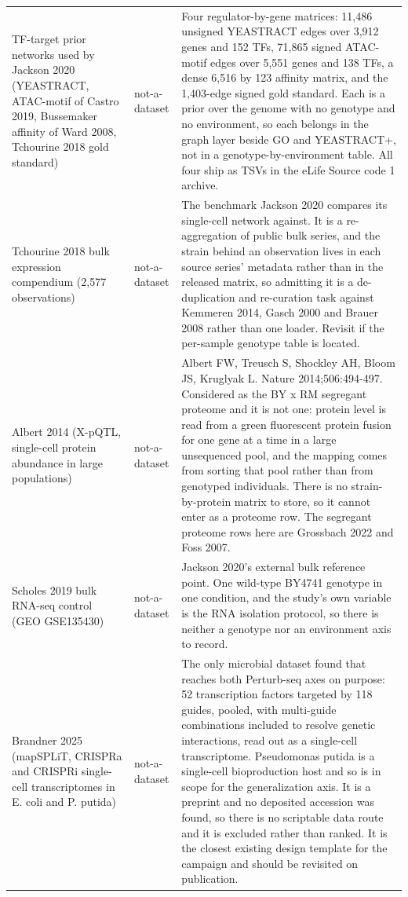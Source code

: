 \begin{longtable}{@{}L{62mm} L{22mm} L{85mm}@{}}
\addlinespace[5pt]
TF-target prior networks used by Jackson 2020 (YEASTRACT, ATAC-motif of Castro 2019, Bussemaker affinity of Ward 2008, Tchourine 2018 gold standard) & not-a-dataset & Four regulator-by-gene matrices: 11,486 unsigned YEASTRACT edges over 3,912 genes and 152 TFs, 71,865 signed ATAC-motif edges over 5,551 genes and 138 TFs, a dense 6,516 by 123 affinity matrix, and the 1,403-edge signed gold standard. Each is a prior over the genome with no genotype and no environment, so each belongs in the graph layer beside GO and YEASTRACT+, not in a genotype-by-environment table. All four ship as TSVs in the eLife Source code 1 archive. \\
\addlinespace[5pt]
Tchourine 2018 bulk expression compendium (2,577 observations) & not-a-dataset & The benchmark Jackson 2020 compares its single-cell network against. It is a re-aggregation of public bulk series, and the strain behind an observation lives in each source series' metadata rather than in the released matrix, so admitting it is a de-duplication and re-curation task against Kemmeren 2014, Gasch 2000 and Brauer 2008 rather than one loader. Revisit if the per-sample genotype table is located. \\
\addlinespace[5pt]
Albert 2014 (X-pQTL, single-cell protein abundance in large populations) & not-a-dataset & Albert FW, Treusch S, Shockley AH, Bloom JS, Kruglyak L. Nature 2014;506:494-497. Considered as the BY x RM segregant proteome and it is not one: protein level is read from a green fluorescent protein fusion for one gene at a time in a large unsequenced pool, and the mapping comes from sorting that pool rather than from genotyped individuals. There is no strain-by-protein matrix to store, so it cannot enter as a proteome row. The segregant proteome rows here are Grossbach 2022 and Foss 2007. \\
\addlinespace[5pt]
Scholes 2019 bulk RNA-seq control (GEO GSE135430) & not-a-dataset & Jackson 2020's external bulk reference point. One wild-type BY4741 genotype in one condition, and the study's own variable is the RNA isolation protocol, so there is neither a genotype nor an environment axis to record. \\
\addlinespace[5pt]
Brandner 2025 (mapSPLiT, CRISPRa and CRISPRi single-cell transcriptomes in E. coli and P. putida) & not-a-dataset & The only microbial dataset found that reaches both Perturb-seq axes on purpose: 52 transcription factors targeted by 118 guides, pooled, with multi-guide combinations included to resolve genetic interactions, read out as a single-cell transcriptome. Pseudomonas putida is a single-cell bioproduction host and so is in scope for the generalization axis. It is a preprint and no deposited accession was found, so there is no scriptable data route and it is excluded rather than ranked. It is the closest existing design template for the campaign and should be revisited on publication. \\

\end{longtable}
